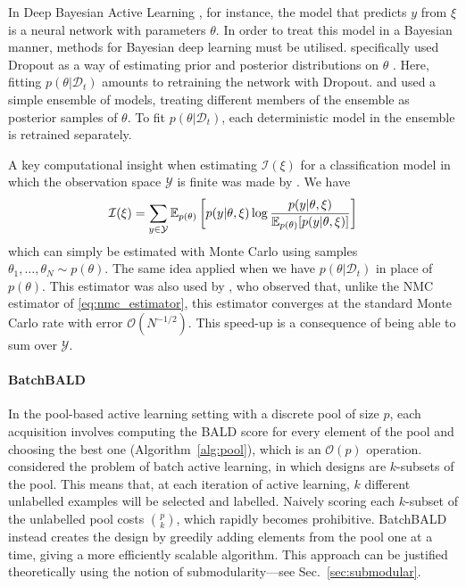 \documentclass[a4paper, 10pt]{report}
\theoremstyle{plain}
\begin{document}
	In Deep Bayesian Active Learning \citep{gal2017deep}, for instance, the model that predicts $y$ from $\xi$ is a neural network with parameters $\theta$.
	In order to treat this model in a Bayesian manner, methods for Bayesian deep learning must be utilised. \citet{gal2017deep} specifically used Dropout as a way of estimating prior and posterior distributions on $\theta$  \citep{gal2016dropout}. Here, fitting $p(\theta|\mathcal{D}_t)$ amounts to retraining the network with Dropout.
	\citet{beluch2018power} and \citet{pop2018deep} used a simple ensemble of models, treating different members of the ensemble as posterior samples of $\theta$.
	To fit $p(\theta|\mathcal{D}_t)$, each deterministic model in the ensemble is retrained separately.
	
	A key computational insight when estimating $\mathcal{I}(\xi)$ for a classification model in which the observation space $\mathcal{Y}$ is finite was made by \citet{houlsby2011bayesian,gal2017deep}.
	We have
	\begin{equation}
	\mathcal{I}(\xi) = \sum_{y\in\mathcal{Y}} \mathbb{E}_{p(\theta)}\left[  p(y|\theta,\xi) \log \frac{p(y|\theta,\xi)}{\mathbb{E}_{p(\theta)}[p(y|\theta,\xi)]}\right] 
	\end{equation}
	which can simply be estimated with Monte Carlo using samples $\theta_1,\dots,\theta_N\sim p(\theta)$. The same idea applied when we have $p(\theta|\mathcal{D}_t)$ in place of $p(\theta)$.
	This estimator was also used by \citet{vincent2017}, who observed that, unlike the NMC estimator of \eqref{eq:nmc_estimator}, this estimator converges at the standard Monte Carlo rate with error $\mathcal{O}(N^{-1/2})$.
	This speed-up is a consequence of being able to sum over $\mathcal{Y}$.
	
	\paragraph{BatchBALD}
	\label{sec:batchbald}
	In the pool-based active learning setting with a discrete pool of size $p$, each acquisition involves computing the BALD score for every element of the pool and choosing the best one (Algorithm~\ref{alg:pool}), which is an $\mathcal{O}(p)$ operation. \citet{kirsch2019batchbald} considered the problem of batch active learning, in which designs are $k$-subsets of the pool. This means that, at each iteration of active learning, $k$ different unlabelled examples will be selected and labelled. 
	Naively scoring each $k$-subset of the unlabelled pool costs $\binom{p}{k}$, which rapidly becomes prohibitive.
	BatchBALD instead creates the design by greedily adding elements from the pool one at a time, giving a more efficiently scalable algorithm.
	This approach can be justified theoretically using the notion of submodularity---see Sec.~\ref{sec:submodular}.
	
\end{document}
